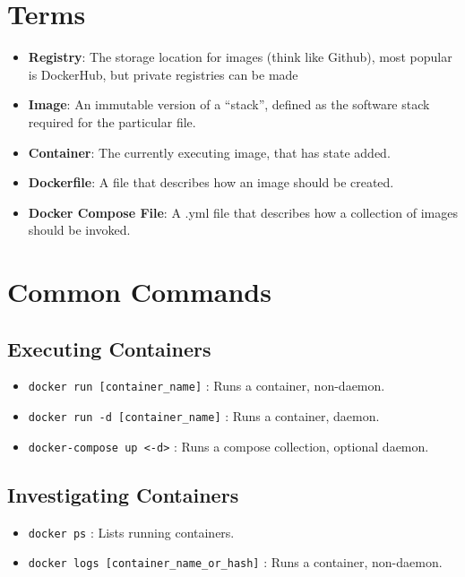 \documentclass[legal,12pt,oneside,pdflatex,final,twocolumn]{article}
\begin{document}
\section{Terms}
\begin{itemize}
  \item \textbf{Registry}: The storage location for images (think like Github), most popular is DockerHub, but private registries can be made
  \item \textbf{Image}: An immutable version of a ``stack'', defined as the software stack required for the particular file.
  \item \textbf{Container}: The currently executing image, that has state added.
  \item \textbf{Dockerfile}: A file that describes how an image should be created.
  \item \textbf{Docker Compose File}: A .yml file that describes how a collection of images should be invoked.
\end{itemize}

\section{Common Commands}
\subsection{Executing Containers}
\begin{itemize}
  \item \texttt{docker run [container_name]} : Runs a container, non-daemon.
  \item \texttt{docker run -d [container_name]} : Runs a container, daemon.
  \item \texttt{docker-compose up <-d>} : Runs a compose collection, optional daemon.
\end{itemize}
\subsection{Investigating Containers}
\begin{itemize}
  \item \texttt{docker ps} : Lists running containers.
  \item \texttt{docker logs [container_name_or_hash]} : Runs a container, non-daemon.
\end{itemize}
\end{document}
